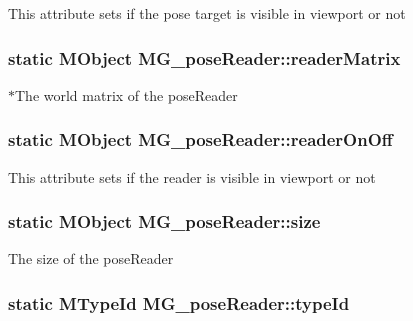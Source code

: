 This attribute sets if the pose target is visible in viewport or not \hypertarget{class_m_g__pose_reader_a8d13cb5a9150c21108b530211b1a5693}{
\subsubsection[{reader\-Matrix}]{\setlength{\rightskip}{0pt plus 5cm}static M\-Object M\-G\-\_\-pose\-Reader\-::reader\-Matrix\hspace{0.3cm}{\ttfamily [static]}}}\label{class_m_g__pose_reader_a8d13cb5a9150c21108b530211b1a5693}
$\ast$\-The world matrix of the pose\-Reader \hypertarget{class_m_g__pose_reader_a431fdcb6a8e76c2963660dc58b7832c0}{
\subsubsection[{reader\-On\-Off}]{\setlength{\rightskip}{0pt plus 5cm}static M\-Object M\-G\-\_\-pose\-Reader\-::reader\-On\-Off\hspace{0.3cm}{\ttfamily [static]}}}\label{class_m_g__pose_reader_a431fdcb6a8e76c2963660dc58b7832c0}
This attribute sets if the reader is visible in viewport or not \hypertarget{class_m_g__pose_reader_a452750f9ea6f7d58cdd582666caf93aa}{
\subsubsection[{size}]{\setlength{\rightskip}{0pt plus 5cm}static M\-Object M\-G\-\_\-pose\-Reader\-::size\hspace{0.3cm}{\ttfamily [static]}}}\label{class_m_g__pose_reader_a452750f9ea6f7d58cdd582666caf93aa}
The size of the pose\-Reader \hypertarget{class_m_g__pose_reader_a0377069c7c81064a0102b87b43f17de7}{
\subsubsection[{type\-Id}]{\setlength{\rightskip}{0pt plus 5cm}static M\-Type\-Id M\-G\-\_\-pose\-Reader\-::type\-Id\hspace{0.3cm}{\ttfamily [static]}}}\label{class_m_g__pose_reader_a0377069c7c81064a0102b87b43f17de7}
